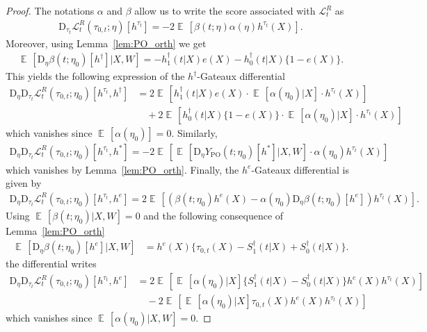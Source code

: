 \documentclass{article}
\DeclareMathOperator{\EX}{\mathbb{E}\,}
\newcommand{\YPO}{Y_{\mathrm{PO}}}
\newcommand{\bD}{\mathrm{D}}
\begin{document}
\begin{proof}
The notations $\alpha$ and $\beta$ allow us to write the score associated with $\mathcal{L}_t^R$ as
\begin{align*}
 \bD_{\tau_t} \mathcal{L}^R_t(\tau_{0,t}; \eta)[h^{\tau_t}] = 
 -2\EX [ \beta(t;\eta)\alpha(\eta)h^{\tau_t}(X) ].
\end{align*}
Moreover, using Lemma~\ref{lem:PO_orth} we get 
\begin{align*}
\EX[\bD_{\eta} \beta(t; \eta_0) [h^\dagger]|X,W] = -h_1^\dagger(t|X)e(X) - h_0^\dagger(t|X) \{1-e(X) \}.
\end{align*}
This yields the following expression of the $h^\dagger$-Gateaux differential 
\begin{align*}
\bD_{\eta} \bD_{\tau_t} \mathcal{L}^R_t(\tau_{0,t}; \eta_0)[h^{\tau_t}, h^\dagger] &= 
  2\EX [ h_1^\dagger(t|X)e(X) \cdot \EX[\alpha(\eta_0)|X] \cdot h^{\tau_t}(X)] \\
& \quad + 2\EX [ h_0^\dagger(t|X)\{1-e(X)\}  \cdot \EX[\alpha(\eta_0)|X] \cdot h^{\tau_t}(X)]  
\end{align*}
which vanishes since $\EX[\alpha(\eta_0)] = 0$.
Similarly, 
\begin{align*}
\bD_{\eta} \bD_{\tau_t} \mathcal{L}^R_t(\tau_{0,t}; \eta_0)[h^{\tau_t}, h^*] = 
-2\EX [ \EX[\bD_{\eta}\YPO(t;\eta_0)[h^*]|X,W] \cdot \alpha(\eta_0) h^{\tau_t}(X) ]
\end{align*}
which vanishes by Lemma~\ref{lem:PO_orth}. Finally, the $h^e$-Gateaux differential is given by 
\begin{align*}
\bD_{\eta} \bD_{\tau_t} \mathcal{L}^R_t(\tau_{0,t}; \eta_0)[h^{\tau_t}, h^e] =
2 \EX[ (\beta(t;\eta_0) h^e(X) - \alpha(\eta_0) \bD_{\eta} \beta(t;\eta_0)[h^e] ) h^{\tau_t}(X)].
\end{align*}
Using $\EX[\beta(t;\eta_0)|X,W] = 0$ and the following consequence of Lemma~\ref{lem:PO_orth} 
\begin{align*}
\EX[\bD_{\eta} \beta(t;\eta_0)[h^e]|X,W] &= 
h^e(X) \{ \tau_{0,t}(X) - S_1^\dagger(t|X) + S_0^\dagger(t|X)\}.
\end{align*}
the differential writes
\begin{align*}
\bD_{\eta} \bD_{\tau_t} \mathcal{L}^R_t(\tau_{0,t}; \eta_0)[h^{\tau_t}, h^e] &= 
 2\EX[\EX[\alpha(\eta_0)|X] \{S_1^\dagger(t|X) - S_0^\dagger(t|X)\} h^e(X) h^{\tau_t}(X)] \\ 
& \quad -2\EX[\EX[\alpha(\eta_0)|X]  \tau_{0,t}(X) h^e(X) h^{\tau_t}(X)]
\end{align*}
which vanishes since $\EX[\alpha(\eta_0)|X,W] = 0$.
\end{proof}
\end{document}
